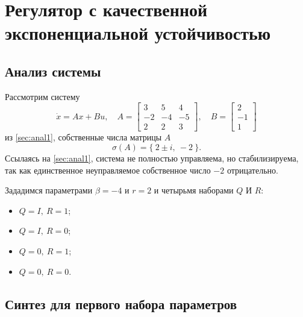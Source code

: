 \section{Регулятор с качественной экспоненциальной устойчивостью}

\subsection{Анализ системы}

Рассмотрим систему
\begin{equation}
    \dot x=Ax+Bu,\quad A=\begin{bmatrix}
        3&5&4\\
        -2&-4&-5\\
        2&2&3
    \end{bmatrix},\quad B=\begin{bmatrix}
        2\\-1\\1
    \end{bmatrix}
\end{equation}
из \autoref{sec:anal1}, собственные числа матрицы $A$
\begin{equation*}
    \sigma(A)=\{\ 2\pm i,\ -2\ \}.
\end{equation*}
Ссылаясь на \autoref{sec:anal1}, система не полностью управляема, 
но стабилизируема, так как единственное
неуправляемое собственное число $-2$ отрицательно.

Зададимся параметрами $\beta=-4$ и $r=2$ и четырьмя наборами $Q$ И $R$:
\begin{itemize}
    \item $Q=I,\ R=1$;
    \item $Q=I,\ R=0$;
    \item $Q=0,\ R=1$;
    \item $Q=0,\ R=0$.
\end{itemize}


\subsection{Синтез для первого набора параметров}

